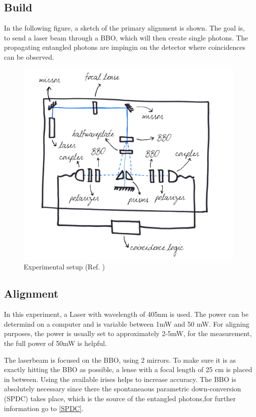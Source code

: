 \documentclass[12pt,a4paper]{article}
\begin{document}
\begin{multicols}{2}
\subsection{Build}
In the following figure, a sketch of the primary alignment is shown. The goal is, to send a laser beam through a BBO, which will then create single photons. The propagating entangled photons are impingin on the detector where coincidences can be observed.
\begin{figure}[H]
 \centering
 \includegraphics[scale=0.5]{./figures/Aufbau_Marion.png}
 \caption{Experimental setup (Ref. \cite{protmarion})}
 \label{fig:setup}
\end{figure}

\subsection{Alignment}


In this experiment, a Laser with wavelength of 405nm is used. The power can be determind on a computer and is variable between 1mW and 50 mW. For aligning purposes, the power is usually set to approximately 2-5mW, for the measurement, the full power of 50mW is helpful. 

The laserbeam is  focused on the BBO, using 2 mirrors. To make sure it is as exactly hitting the BBO as possible, a lense with a focal length of 25 cm is placed in between. Using the available irises helps to increase accuracy. The BBO is absolutely necessary since there the spontaneaous parametric down-conversion (SPDC) takes place, which is the source of the entangled photons,for further information go to \ref{SPDC}. 


\end{multicols}
\end{document}
